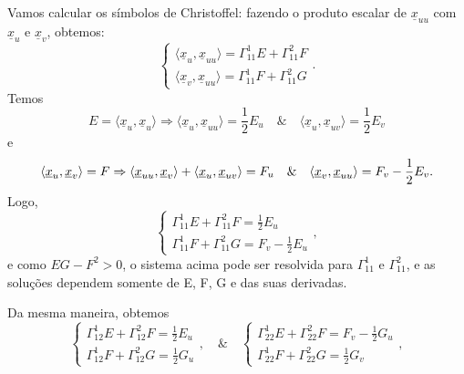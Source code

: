\documentclass[../differential_geometry.tex]{subfiles}
\begin{document}
\begin{proof*}
	Vamos calcular os símbolos de Christoffel: fazendo o produto escalar de \(\underline{x}_{uu}\) com \(\underline{x}_u\) e \(\underline{x}_v\), obtemos:
	\[
		\left\{\begin{array}{ll}
			\langle \underline{x}_u, \underline{x}_{uu} \rangle = \Gamma_{11}^{1}E + \Gamma_{11}^{2}F \\
			\langle \underline{x}_{v}, \underline{x}_{uu} \rangle = \Gamma_{11}^{1}F + \Gamma_{11}^{2}G
		\end{array}\right..
	\]
	Temos
	\[
		E = \langle \underline{x}_u, \underline{x}_u \rangle \Rightarrow \langle \underline{x}_u, \underline{x}_{uu} \rangle = \frac{1}{2}E_{u} \quad\&\quad \langle \underline{x}_u, \underline{x}_{uv} \rangle = \frac{1}{2}E_{v}
	\]
	e
	\[
		\langle \underline{x}_u, \underline{x}_v \rangle = F \Rightarrow \langle \underline{x}_{uu}, \underline{x}_v \rangle + \langle \underline{x}_u, \underline{x}_{uv} \rangle = F_{u}\\  \quad\&\quad \langle \underline{x}_v, \underline{x}_{uu} \rangle = F_{v}-\frac{1}{2}E_{v}.
	\]
	Logo,
	\[
		\left\{\begin{array}{ll}
			\Gamma_{11}^{1}E + \Gamma_{11}^{2}F = \frac{1}{2}E_{u} \\
			\Gamma_{11}^{1} F + \Gamma_{11}^{2}G = F_{v} - \frac{1}{2}E_{u}
		\end{array}\right.,
	\]
	e como \(EG-F^{2}> 0\), o sistema acima pode ser resolvida para \(\Gamma_{11}^{1}\) e \(\Gamma_{11}^{2}\), e as soluções dependem somente de E, F, G e das suas derivadas.

	Da mesma maneira, obtemos
	\[
		\left\{\begin{array}{ll}
			\Gamma_{12}^{1}E + \Gamma_{12}^{2}F = \frac{1}{2}E_{u} \\
			\Gamma_{12}^{1} F + \Gamma_{12}^{2}G = \frac{1}{2}G_{u}
		\end{array}\right., \quad\&\quad
		\left\{\begin{array}{ll}
			\Gamma_{22}^{1}E + \Gamma_{22}^{2}F = F_{v}-\frac{1}{2}G_{u} \\
			\Gamma_{22}^{1} F + \Gamma_{22}^{2}G = \frac{1}{2}G_{v}
		\end{array}\right.,
	\]


\end{proof*}
\end{document}
